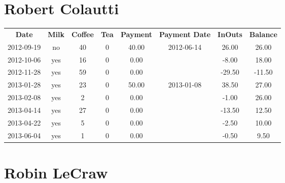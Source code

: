 \section{Robert Colautti}

\begin{center}
\begin{tabular}{cccccccc}
\textbf{Date} & \textbf{Milk} & \textbf{Coffee} & \textbf{Tea} & \textbf{Payment} & \textbf{Payment Date} & \textbf{InOuts} & \textbf{Balance} \\
2012-09-19 & no & 40 & 0 & 40.00 & 2012-06-14 &  26.00 &  26.00\\ 
2012-10-06 & yes & 16 & 0 &  0.00 &  &  -8.00 &  18.00\\ 
2012-11-28 & yes & 59 & 0 &  0.00 &  & -29.50 & -11.50\\ 
2013-01-28 & yes & 23 & 0 & 50.00 & 2013-01-08 &  38.50 &  27.00\\ 
2013-02-08 & yes &  2 & 0 &  0.00 &  &  -1.00 &  26.00\\ 
2013-04-14 & yes & 27 & 0 &  0.00 &  & -13.50 &  12.50\\ 
2013-04-22 & yes &  5 & 0 &  0.00 &  &  -2.50 &  10.00\\ 
2013-06-04 & yes &  1 & 0 &  0.00 &  &  -0.50 &   9.50
\end{tabular}
\end{center}

\section{Robin LeCraw}

